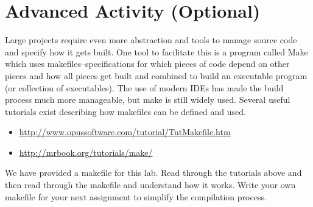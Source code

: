 \documentclass[12pt]{scrartcl}
\begin{document}
\section{Advanced Activity (Optional)}

Large projects require even more abstraction and tools to manage 
source code and specify how it gets built.  One tool to facilitate this 
is a program called Make which uses makefiles--specifications for 
which pieces of code depend on other pieces and how all pieces 
get built and combined to build an executable program (or collection 
of executables).  The use of modern IDEs has made the build process 
much more manageable, but make is still widely used.  Several 
useful tutorials exist describing how makefiles can be defined and 
used.
\begin{itemize}
  \item \url{http://www.opussoftware.com/tutorial/TutMakefile.htm}
  \item \url{http://mrbook.org/tutorials/make/}
\end{itemize}
We have provided a makefile for this lab.  Read through the tutorials
above and then read through the makefile and understand how it works.
Write your own makefile for your next assignment to simplify the
compilation process.
\end{document}
